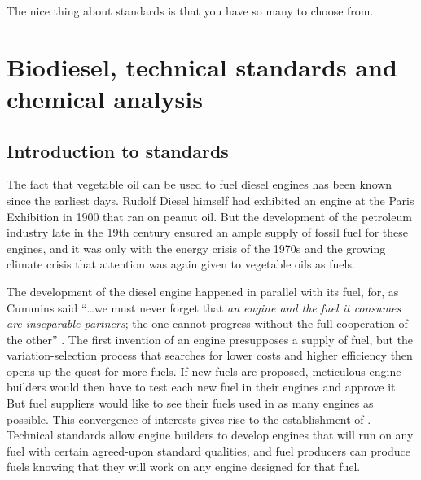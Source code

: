 
\begin{savequote}[\quotewidth]
The nice thing about standards is that you have so many to choose from.
\end{savequote}


\chapter[Biodiesel standards]{Biodiesel, technical standards and chemical analysis} %

\label{Chapter3} %

\section{Introduction to standards}
\label{Sec:Intro}

The fact that vegetable oil can be used to fuel diesel engines has been known
since the earliest days. Rudolf Diesel himself had exhibited an engine at the
Paris Exhibition in 1900 \autocite{Knothe2010} that ran on peanut oil. But the
development of the petroleum industry late in the 19th century ensured an ample
supply of fossil fuel for these engines, and it was only with the energy crisis
of the 1970s and the growing climate crisis that attention was again given to
vegetable oils as fuels.

The development of the diesel engine happened in parallel with its fuel, for, as
Cummins said ``\ldots we must never forget that \textit{an engine and the fuel
it consumes are inseparable partners}; the one cannot progress without the full
cooperation of the other'' \autocite{Cummins1989}. The first invention of an
engine presupposes a supply of fuel, but the variation-selection process that
searches for lower costs and higher efficiency then opens up the quest for more
fuels. If new fuels are proposed, meticulous engine builders would then have to
test each new fuel in their engines and approve it. But fuel suppliers would
like to see their fuels used in as many engines as possible. This convergence of
interests gives rise to the establishment of .
Technical standards allow engine builders to develop engines that will run on
any fuel with certain agreed-upon standard qualities, and fuel producers can
produce fuels knowing that they will work on any engine designed for that fuel.

